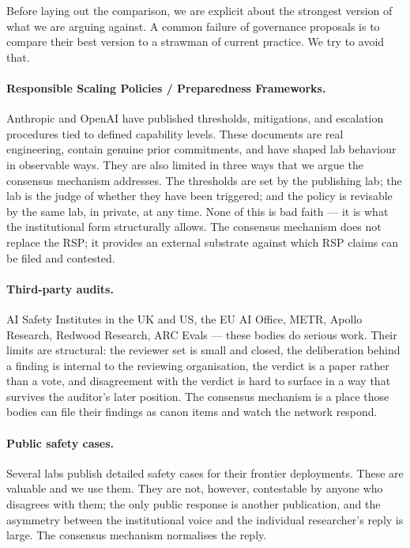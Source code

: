 \documentclass[11pt,a4paper]{article}
\begin{document}
Before laying out the comparison, we are explicit about the
strongest version of what we are arguing against. A common
failure of governance proposals is to compare their best version
to a strawman of current practice. We try to avoid that.

\paragraph{Responsible Scaling Policies / Preparedness Frameworks.}
Anthropic and OpenAI have published thresholds, mitigations, and
escalation procedures tied to defined capability levels. These
documents are real engineering, contain genuine prior
commitments, and have shaped lab behaviour in observable ways.
They are also limited in three ways that we argue the consensus
mechanism addresses. The thresholds are set by the publishing
lab; the lab is the judge of whether they have been triggered;
and the policy is revisable by the same lab, in private, at any
time. None of this is bad faith --- it is what the institutional
form structurally allows. The consensus mechanism does not
replace the RSP; it provides an external substrate against which
RSP claims can be filed and contested.

\paragraph{Third-party audits.} AI Safety Institutes in the UK
and US, the EU AI Office, METR, Apollo Research, Redwood
Research, ARC Evals --- these bodies do serious work. Their
limits are structural: the reviewer set is small and closed, the
deliberation behind a finding is internal to the reviewing
organisation, the verdict is a paper rather than a vote, and
disagreement with the verdict is hard to surface in a way that
survives the auditor's later position. The consensus mechanism
is a place those bodies can file their findings as canon items
and watch the network respond.

\paragraph{Public safety cases.} Several labs publish detailed
safety cases for their frontier deployments. These are valuable
and we use them. They are not, however, contestable by anyone
who disagrees with them; the only public response is another
publication, and the asymmetry between the institutional voice
and the individual researcher's reply is large. The consensus
mechanism normalises the reply.
\end{document}
